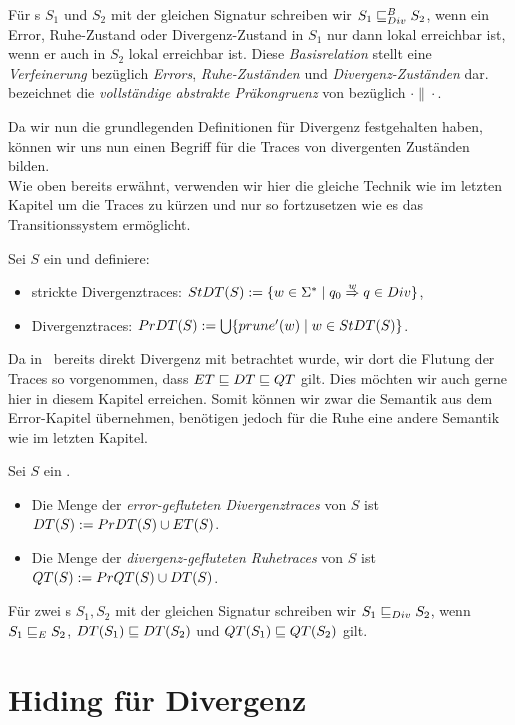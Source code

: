 \begin{Def}
Für \EIO{}s $S_1$ und $S_2$ mit der gleichen Signatur schreiben wir $S_1\sqsubseteq _{Div}^B
S_2$, wenn ein Error, Ruhe-Zustand oder Divergenz-Zustand in $S_1$ nur dann
lokal erreichbar ist, wenn er auch in $S_2$ lokal erreichbar ist. Diese
\emph{Basisrelation} stellt eine \emph{Verfeinerung} bezüglich \emph{Errors},
\emph{Ruhe-Zuständen} und \emph{Divergenz-Zuständen} dar.\\
\DCRel{} bezeichnet die \emph{vollständige abstrakte Präkongruenz} von \DBRel{}
bezüglich $\cdot\|\cdot$.
\end{Def}

Da wir nun die grundlegenden Definitionen für Divergenz festgehalten haben,
können wir uns nun einen Begriff für die Traces von divergenten Zuständen
bilden.\\
Wie oben bereits erwähnt, verwenden wir hier die gleiche Technik wie im letzten
Kapitel um die Traces zu kürzen und nur so fortzusetzen wie es das
Transitionssystem ermöglicht.

\begin{Def}[Divergenztraces]
  Sei $S$ ein \EIO{} und definiere:
  \begin{itemize}
    \item strickte Divergenztraces: $StDT{}(S) := \{w\in\Sigma ^*\mid q_0
      \overset{w}{\Rightarrow} q\in Div\}$,
    \item Divergenztraces: $PrDT{}(S) := \bigcup\{prune' (w)\mid
      w\in StDT{}(S)\}$.
  \end{itemize}
\end{Def}

Da in~\cite{Chilton2013} bereits direkt Divergenz mit betrachtet wurde, wir dort
die Flutung der Traces so vorgenommen, dass $ET\sqsubseteq DT\sqsubseteq QT$
gilt. Dies möchten wir auch gerne hier in diesem Kapitel erreichen. Somit
können wir zwar die Semantik aus dem Error-Kapitel übernehmen, benötigen jedoch
für die Ruhe eine andere Semantik wie im letzten Kapitel.

\begin{Def}
  Sei $S$ ein \EIO{}.
  \begin{itemize}
    \item Die Menge der \emph{error-gefluteten Divergenztraces} von $S$ ist
      $DT{}(S) := PrDT{}(S)\cup ET{}(S)$.
    \item Die Menge der \emph{divergenz-gefluteten Ruhetraces} von $S$ ist
      $QT{}(S) := PrQT{}(S)\cup DT{}(S)$.
  \end{itemize}
  Für zwei \EIO{}s $S_1, S_2$ mit der gleichen Signatur schreiben wir $S_1\sqsubseteq _{Div}
  S_2$, wenn $S_1\sqsubseteq _E S_2$, $DT{}(S_1)\sqsubseteq DT{}(S_2)$ und
  $QT{}(S_1)\sqsubseteq QT{}(S_2)$ gilt.
\end{Def}

\section{Hiding für Divergenz}

